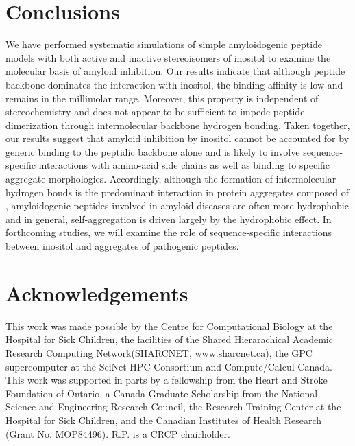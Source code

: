 \section{Conclusions}
We have performed systematic simulations of simple amyloidogenic peptide models with both active and inactive stereoisomers of inositol to examine the molecular basis of amyloid inhibition. Our results indicate that although peptide backbone dominates the interaction with inositol, the binding affinity is low and remains in the millimolar range. Moreover, this property is independent of stereochemistry and does not appear to be sufficient to impede peptide dimerization through intermolecular backbone hydrogen bonding. Taken together, our results suggest that amyloid inhibition by inositol cannot be accounted for by generic binding to the peptidic backbone alone and is likely to involve sequence-specific interactions with amino-acid side chains as well as binding to specific aggregate morphologies. Accordingly, although the formation of intermolecular hydrogen bonds is the predominant interaction in protein aggregates composed of \gafour, amyloidogenic peptides involved in amyloid diseases are often more hydrophobic and in general, self-aggregation is driven largely by the hydrophobic effect.\cite{Chiti:2006p20} In forthcoming studies, we will examine the role of sequence-specific interactions between inositol and aggregates of pathogenic peptides.

\section*{Acknowledgements}
This work was made possible by the Centre for Computational Biology at the Hospital for Sick Children, the facilities of the Shared Hierarachical Academic Research Computing Network(SHARCNET, www.sharcnet.ca), the GPC supercomputer at the SciNet HPC Consortium and Compute/Calcul Canada. This work was supported in parts by a fellowship from the Heart and Stroke Foundation of Ontario, a Canada Graduate Scholarship from the National Science and Engineering Research Council, the Research Training Center at the Hospital for Sick Children, and the Canadian Institutes of Health Research (Grant No. MOP84496). R.P. is a CRCP chairholder.



